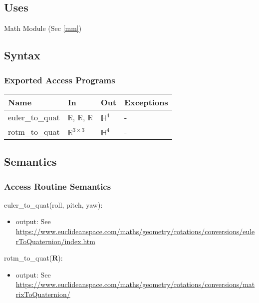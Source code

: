 \documentclass[12pt, titlepage]{article}
\begin{document}
\subsection{Uses}
Math Module (Sec \ref{mm})

\subsection{Syntax}

\subsubsection{Exported Access Programs}

\begin{center}
\begin{tabular}{p{4cm} p{3cm} p{2cm} p{2.5cm}}
\hline
\textbf{Name} & \textbf{In} & \textbf{Out} & \textbf{Exceptions} \\
\hline
euler\_to\_quat & $\mathbb{R}$, $\mathbb{R}$, $\mathbb{R}$ & $\mathbb{H}^4$ & - \\
rotm\_to\_quat & $\mathbb{R}^{3 \times 3}$ & $\mathbb{H}^4$ & - \\
\hline
\end{tabular}
\end{center}

\subsection{Semantics}

\subsubsection{Access Routine Semantics}

\noindent euler\_to\_quat(roll, pitch, yaw):
\begin{itemize}
\item output: See
\url{https://www.euclideanspace.com/maths/geometry/rotations/conversions/eulerToQuaternion/index.htm}
\end{itemize}

\noindent rotm\_to\_quat($\mathbf{R}$):
\begin{itemize}
\item output: See
\url{https://www.euclideanspace.com/maths/geometry/rotations/conversions/matrixToQuaternion/}
\end{itemize}
\end{document}
